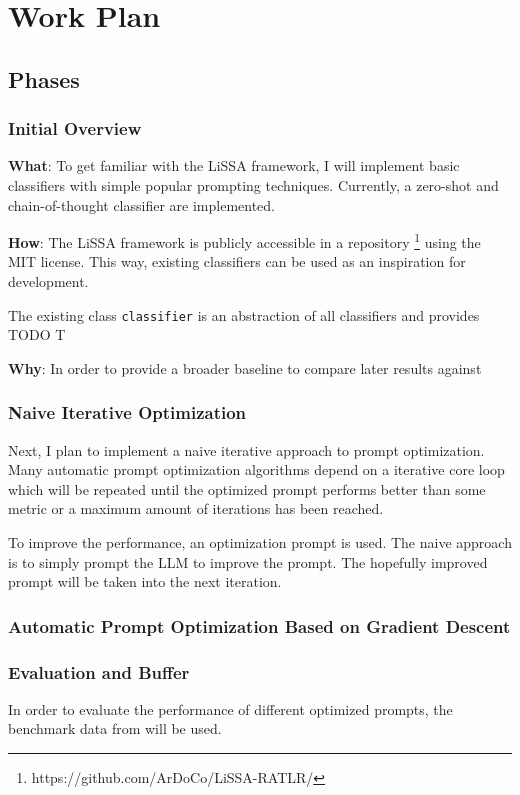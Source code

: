 \chapter{Work Plan}

\section{Phases}
\subsection{Initial Overview}

\textbf{What}: To get familiar with the LiSSA framework, I will implement basic classifiers with simple popular prompting techniques.
Currently, a zero-shot and chain-of-thought classifier are implemented.

\textbf{How}: The LiSSA framework is publicly accessible in a repository \footnote{https://github.com/ArDoCo/LiSSA-RATLR/} using the MIT license. This way, existing classifiers can be used as an inspiration for development. 

The existing class \verb|classifier| is an abstraction of all classifiers and provides TODO
T

\textbf{Why}: In order to provide a broader baseline to compare later results against 

\subsection{Naive Iterative Optimization}
Next, I plan to implement a naive iterative approach to prompt optimization. Many automatic prompt optimization algorithms depend on a iterative core loop which will be repeated until the optimized prompt performs better than some metric or a maximum amount of iterations has been reached.

To improve the performance, an optimization prompt is used. The naive approach is to simply prompt the LLM to improve the prompt. The hopefully improved prompt will be taken into the next iteration.

\subsection{Automatic Prompt Optimization Based on Gradient Descent}

\subsection{Evaluation and Buffer}
In order to evaluate the performance of different optimized prompts, the benchmark data from \citeauthor{fuchss2022establishing} \cite{fuchss2022establishing} will be used.

